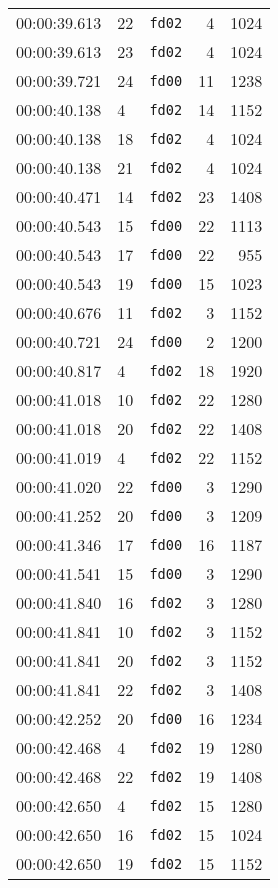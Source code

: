 \documentclass{article}
\begin{document}
\begin{longtable}{lllrr}
00:00:39.613 & 22 & \texttt{fd02} & 4 & 1024 \\
00:00:39.613 & 23 & \texttt{fd02} & 4 & 1024 \\
00:00:39.721 & 24 & \texttt{fd00} & 11 & 1238 \\
00:00:40.138 & 4 & \texttt{fd02} & 14 & 1152 \\
00:00:40.138 & 18 & \texttt{fd02} & 4 & 1024 \\
00:00:40.138 & 21 & \texttt{fd02} & 4 & 1024 \\
00:00:40.471 & 14 & \texttt{fd02} & 23 & 1408 \\
00:00:40.543 & 15 & \texttt{fd00} & 22 & 1113 \\
00:00:40.543 & 17 & \texttt{fd00} & 22 & 955 \\
00:00:40.543 & 19 & \texttt{fd00} & 15 & 1023 \\
00:00:40.676 & 11 & \texttt{fd02} & 3 & 1152 \\
00:00:40.721 & 24 & \texttt{fd00} & 2 & 1200 \\
00:00:40.817 & 4 & \texttt{fd02} & 18 & 1920 \\
00:00:41.018 & 10 & \texttt{fd02} & 22 & 1280 \\
00:00:41.018 & 20 & \texttt{fd02} & 22 & 1408 \\
00:00:41.019 & 4 & \texttt{fd02} & 22 & 1152 \\
00:00:41.020 & 22 & \texttt{fd00} & 3 & 1290 \\
00:00:41.252 & 20 & \texttt{fd00} & 3 & 1209 \\
00:00:41.346 & 17 & \texttt{fd00} & 16 & 1187 \\
00:00:41.541 & 15 & \texttt{fd00} & 3 & 1290 \\
00:00:41.840 & 16 & \texttt{fd02} & 3 & 1280 \\
00:00:41.841 & 10 & \texttt{fd02} & 3 & 1152 \\
00:00:41.841 & 20 & \texttt{fd02} & 3 & 1152 \\
00:00:41.841 & 22 & \texttt{fd02} & 3 & 1408 \\
00:00:42.252 & 20 & \texttt{fd00} & 16 & 1234 \\
00:00:42.468 & 4 & \texttt{fd02} & 19 & 1280 \\
00:00:42.468 & 22 & \texttt{fd02} & 19 & 1408 \\
00:00:42.650 & 4 & \texttt{fd02} & 15 & 1280 \\
00:00:42.650 & 16 & \texttt{fd02} & 15 & 1024 \\
00:00:42.650 & 19 & \texttt{fd02} & 15 & 1152 \\

\end{longtable}
\end{document}
